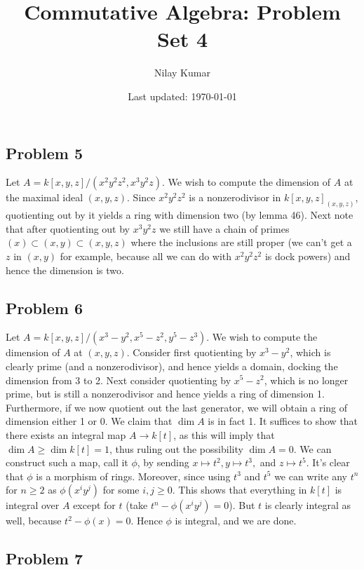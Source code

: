 \documentclass{../../mathnotes}
\title{Commutative Algebra: Problem Set 4}
\author{Nilay Kumar}
\date{Last updated: \today}
\begin{document}
\maketitle


\subsection*{Problem 5}

Let $A=k[x,y,z]/(x^2y^2z^2, x^3y^2z)$. We wish to compute the dimension of $A$ at the maximal ideal $(x,y,z)$.
Since $x^2y^2z^2$ is a nonzerodivisor in $k[x,y,z]_{(x,y,z)}$, quotienting out by it yields a ring with dimension two (by lemma 46).
Next note that after quotienting out by $x^3y^2z$ we still have a chain of primes $(x)\subset (x,y)\subset (x,y,z)$ where the inclusions
are still proper (we can't get a $z$ in $(x,y)$ for example, because all we can do with $x^2y^2z^2$ is dock powers) and hence the dimension is two.


\subsection*{Problem 6}

Let $A=k[x,y,z]/(x^3-y^2,x^5-z^2,y^5-z^3)$. We wish to compute the dimension of $A$ at $(x,y,z)$. Consider first quotienting by $x^3-y^2$, which
is clearly prime (and a nonzerodivisor), and hence yields a domain, docking the dimension from 3 to 2. Next consider quotienting by $x^5-z^2$, which
is no longer prime, but is still a nonzerodivisor and hence yields a ring of dimension 1. Furthermore, if we now quotient out the last generator,
we will obtain a ring of dimension either 1 or 0. We claim that $\dim A$ is in fact 1. It suffices to show that there exists an integral
map $A\to k[t]$, as this will imply that $\dim A\geq \dim k[t]=1$, thus ruling out the possibility $\dim A=0$. We can construct such a map,
call it $\phi$, by sending $x\mapsto t^2,y\mapsto t^3,$ and $z\mapsto t^5$. It's clear that $\phi$ is a morphism of rings. 
Moreover, since
using $t^3$ and $t^5$ we can write any $t^n$ for $n\geq 2$ as $\phi(x^iy^j)$ for some $i,j\geq 0$. This shows that everything in $k[t]$ is integral
over $A$ except for $t$ (take $t^n-\phi(x^iy^j)=0$). But $t$ is clearly integral as well, because $t^2-\phi(x)=0$. Hence $\phi$ is integral, 
and we are done.


\subsection*{Problem 7}
\end{document}
